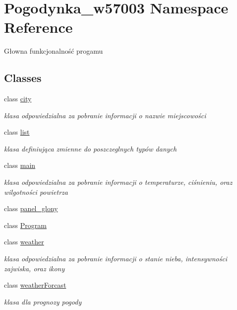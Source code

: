 \hypertarget{namespace_pogodynka__w57003}{}\section{Pogodynka\+\_\+w57003 Namespace Reference}
\label{namespace_pogodynka__w57003}


Głowna funkcjonalność progamu  


\subsection*{Classes}
\begin{DoxyCompactItemize}
\item 
class \mbox{\hyperlink{class_pogodynka__w57003_1_1city}{city}}
\begin{DoxyCompactList}\small\item\em klasa odpowiedzialna za pobranie informacji o nazwie miejscowości \end{DoxyCompactList}\item 
class \mbox{\hyperlink{class_pogodynka__w57003_1_1list}{list}}
\begin{DoxyCompactList}\small\item\em klasa definiująca zmienne do poszczeglnych typów danych \end{DoxyCompactList}\item 
class \mbox{\hyperlink{class_pogodynka__w57003_1_1main}{main}}
\begin{DoxyCompactList}\small\item\em klasa odpowiedzialna za pobranie informacji o temperaturze, ciśnieniu, oraz wilgotności powietrza \end{DoxyCompactList}\item 
class \mbox{\hyperlink{class_pogodynka__w57003_1_1panel__glony}{panel\+\_\+glony}}
\item 
class \mbox{\hyperlink{class_pogodynka__w57003_1_1_program}{Program}}
\item 
class \mbox{\hyperlink{class_pogodynka__w57003_1_1weather}{weather}}
\begin{DoxyCompactList}\small\item\em klasa odpowiedzialna za pobranie informacji o stanie nieba, intensywności zajwiska, oraz ikony \end{DoxyCompactList}\item 
class \mbox{\hyperlink{class_pogodynka__w57003_1_1weather_forcast}{weather\+Forcast}}
\begin{DoxyCompactList}\small\item\em klasa dla prognozy pogody \end{DoxyCompactList}\item 

\end{DoxyCompactItemize}
